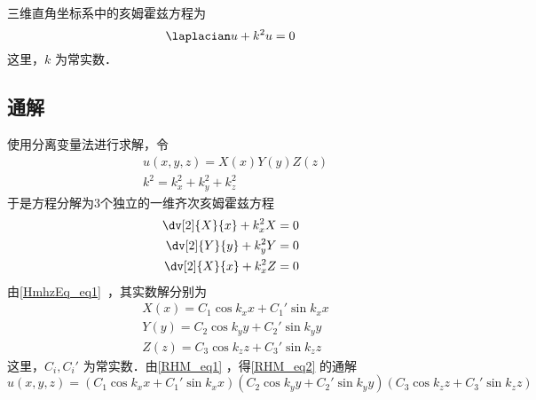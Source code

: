 

三维直角坐标系中的亥姆霍兹方程为
\begin{equation}\label{RHM_eq2}
\laplacian u+k^2u=0
\end{equation}
这里，$k$ 为常实数．
\subsection{通解}
使用分离变量法进行求解，令
\begin{equation}\label{RHM_eq1}
\begin{aligned}
&u(x,y,z)=X(x)Y(y)Z(z)\\
&k^2=k_x^2+k_y^2+k_z^2
\end{aligned}
\end{equation}
于是方程分解为3个独立的一维齐次亥姆霍兹方程
\begin{equation}
\begin{aligned}
\dv[2]{X}{x}+k_x^2X=0\\
\dv[2]{Y}{y}+k_y^2Y=0\\
\dv[2]{X}{x}+k_x^2Z=0
\end{aligned}
\end{equation}
由\autoref{HmhzEq_eq1}~，其实数解分别为
\begin{equation}
\begin{aligned}
&X(x)=C_1\cos k_xx+C_1'\sin k_xx\\
&Y(y)=C_2\cos k_yy+C_2'\sin k_yy\\
&Z(z)=C_3\cos k_zz+C_3'\sin k_zz
\end{aligned}
\end{equation}
这里，$C_i,C_i'$ 为常实数．由\autoref{RHM_eq1} ，得\autoref{RHM_eq2} 的通解
\begin{equation}\label{RHM_eq3}
u(x,y,z)=(C_1\cos k_xx+C_1'\sin k_xx)(C_2\cos k_yy+C_2'\sin k_yy)(C_3\cos k_zz+C_3'\sin k_zz)
\end{equation}
